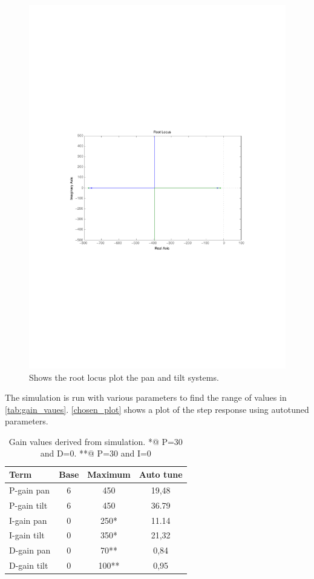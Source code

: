 \begin{figure}[htb]
	\centering
	\includegraphics[width=\textwidth,trim=0 270 0 270]{graphics/rlocus_plot.pdf} %
	\caption{Shows the root locus plot the pan and tilt systems.}
	\label{fig:rlocus_plot}			%
\end{figure}

The simulation is run with various parameters to find the range of values in \ref{tab:gain_vaues}. \ref{chosen_plot} shows a plot of the step response using autotuned parameters.

\begin{table}[htb]				
	\begin{center}
	\begin{tabular}{l|c|c|c}			
	Term & Base & Maximum & Auto tune \\			
	\hline												
P-gain pan& 6 & 450 & 19,48\\
P-gain tilt& 6 & 450 & 36.79 \\
I-gain pan& 0 & 250* & 11.14  \\
I-gain tilt& 0 & 350* & 21,32 \\
D-gain pan& 0 & 70** & 0,84 \\
D-gain tilt& 0 & 100** & 0,95\\
	\end{tabular}
	\end{center}
	\caption{Gain values derived from simulation. *@ P=30 and D=0. **@ P=30 and I=0}				
	\label{tab:gain_values}			
\end{table}

